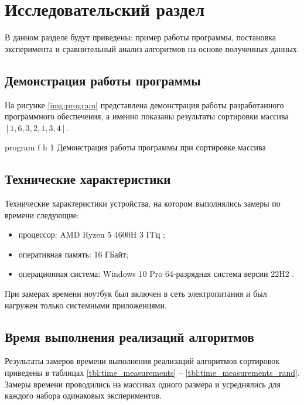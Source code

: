 \chapter{Исследовательский раздел}

В данном разделе будут приведены: пример работы программы, постановка эксперимента и сравнительный анализ алгоритмов на основе полученных данных.

\section{Демонстрация работы программы}


На рисунке \ref{img:program} представлена демонстрация работы разработанного программного обеспечения, а именно показаны результаты сортировки массива $[1, 6, 3, 2, 1, 3, 4]$.  
\clearpage

{program} %
{f} %
{h} %
{1\textwidth} %
{Демонстрация работы программы при сортировке массива} %

\clearpage


\section{Технические характеристики}

Технические характеристики устройства, на котором выполнялись замеры по времени следующие:

\begin{itemize}
	\item процессор: AMD Ryzen 5 4600H 3 ГГц \cite{amd};
	\item оперативная память: 16 ГБайт;
	\item операционная система: Windows 10 Pro 64-разрядная система версии 22H2 \cite{windows}.
\end{itemize}

При замерах времени ноутбук был включен в сеть электропитания и был нагружен только системными приложениями.

\section{Время выполнения реализаций алгоритмов}

Результаты замеров времени выполнения реализаций алгоритмов сортировок приведены в таблицах \ref{tbl:time_measurements} -- \ref{tbl:time_measurements_rand}.
Замеры времени проводились на массивах одного размера и усреднялись для каждого набора одинаковых экспериментов.

